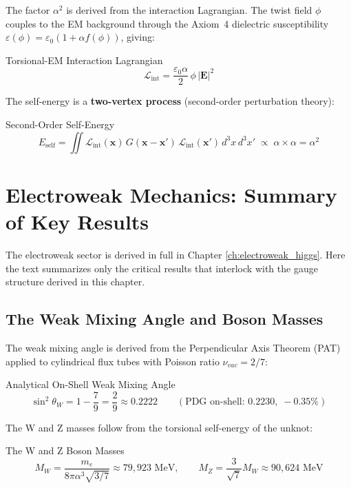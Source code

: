 The factor $\alpha^2$ is derived from the interaction Lagrangian. The twist field $\phi$ couples to the EM background through the Axiom~4 dielectric susceptibility $\varepsilon(\phi) = \varepsilon_0(1 + \alpha f(\phi))$, giving:
\begin{resultbox}{Torsional-EM Interaction Lagrangian}
\begin{equation}
    \mathcal{L}_{\text{int}} = \frac{\varepsilon_0 \alpha}{2}\,\phi\,|\mathbf{E}|^2
\end{equation}
\end{resultbox}
The self-energy is a \textbf{two-vertex process} (second-order perturbation theory):
\begin{resultbox}{Second-Order Self-Energy}
\begin{equation}
    E_{\text{self}} = \iint \mathcal{L}_{\text{int}}(\mathbf{x})\, G(\mathbf{x}-\mathbf{x}')\, \mathcal{L}_{\text{int}}(\mathbf{x}')\, d^3x\, d^3x' \;\propto\; \alpha \times \alpha = \alpha^2
\end{equation}
\end{resultbox}
\section{Electroweak Mechanics: Summary of Key Results}

The electroweak sector is derived in full in Chapter \ref{ch:electroweak_higgs}. Here the text summarizes only the critical results that interlock with the gauge structure derived in this chapter.

\subsection{The Weak Mixing Angle and Boson Masses}
The weak mixing angle is derived from the Perpendicular Axis Theorem (PAT) applied to cylindrical flux tubes with Poisson ratio $\nu_{vac} = 2/7$:
\begin{resultbox}{Analytical On-Shell Weak Mixing Angle}
\begin{equation}
    \sin^2\theta_W = 1 - \frac{7}{9} = \frac{2}{9} \approx 0.2222 \qquad (\text{PDG on-shell: } 0.2230, \; -0.35\%)
\end{equation}
\end{resultbox}

The W and Z masses follow from the torsional self-energy of the unknot:
\begin{resultbox}{The W and Z Boson Masses}
\begin{equation}
    M_W = \frac{m_e}{8\pi\alpha^3\sqrt{3/7}} \approx 79{,}923 \text{ MeV}, \qquad M_Z = \frac{3}{\sqrt{7}}M_W \approx 90{,}624 \text{ MeV}
\end{equation}
\end{resultbox}


